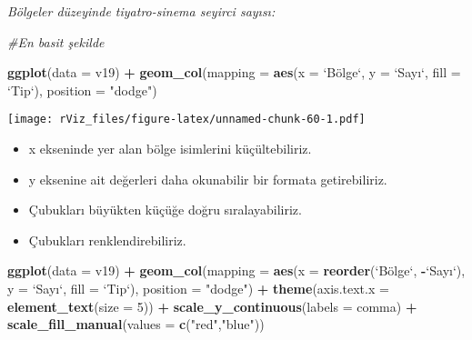\documentclass[
]{book}
\newenvironment{Shaded}{\begin{snugshade}}{\end{snugshade}}
\newcommand{\CommentTok}[1]{\textcolor[rgb]{0.56,0.35,0.01}{\textit{#1}}}
\newcommand{\DataTypeTok}[1]{\textcolor[rgb]{0.13,0.29,0.53}{#1}}
\newcommand{\DecValTok}[1]{\textcolor[rgb]{0.00,0.00,0.81}{#1}}
\newcommand{\KeywordTok}[1]{\textcolor[rgb]{0.13,0.29,0.53}{\textbf{#1}}}
\newcommand{\NormalTok}[1]{#1}
\newcommand{\OperatorTok}[1]{\textcolor[rgb]{0.81,0.36,0.00}{\textbf{#1}}}
\newcommand{\StringTok}[1]{\textcolor[rgb]{0.31,0.60,0.02}{#1}}
\begin{document}
\emph{Bölgeler düzeyinde tiyatro-sinema seyirci sayısı:}

\begin{Shaded}
\begin{Highlighting}[]
\CommentTok{#En basit şekilde}

\KeywordTok{ggplot}\NormalTok{(}\DataTypeTok{data =}\NormalTok{ v19) }\OperatorTok{+}
\StringTok{  }\KeywordTok{geom_col}\NormalTok{(}\DataTypeTok{mapping =} \KeywordTok{aes}\NormalTok{(}\DataTypeTok{x =} \StringTok{`}\DataTypeTok{Bölge}\StringTok{`}\NormalTok{, }\DataTypeTok{y =} \StringTok{`}\DataTypeTok{Sayı}\StringTok{`}\NormalTok{, }\DataTypeTok{fill =} \StringTok{`}\DataTypeTok{Tip}\StringTok{`}\NormalTok{), }\DataTypeTok{position =} \StringTok{"dodge"}\NormalTok{)}
\end{Highlighting}
\end{Shaded}

\texttt{[image: rViz\_files/figure-latex/unnamed-chunk-60-1.pdf]}

\begin{itemize}
\item
  x ekseninde yer alan bölge isimlerini küçültebiliriz.
\item
  y eksenine ait değerleri daha okunabilir bir formata getirebiliriz.
\item
  Çubukları büyükten küçüğe doğru sıralayabiliriz.
\item
  Çubukları renklendirebiliriz.
\end{itemize}

\begin{Shaded}
\begin{Highlighting}[]
\KeywordTok{ggplot}\NormalTok{(}\DataTypeTok{data =}\NormalTok{ v19) }\OperatorTok{+}
\StringTok{  }\KeywordTok{geom_col}\NormalTok{(}\DataTypeTok{mapping =} \KeywordTok{aes}\NormalTok{(}\DataTypeTok{x =} \KeywordTok{reorder}\NormalTok{(}\StringTok{`}\DataTypeTok{Bölge}\StringTok{`}\NormalTok{, }\OperatorTok{-}\StringTok{`}\DataTypeTok{Sayı}\StringTok{`}\NormalTok{), }\DataTypeTok{y =} \StringTok{`}\DataTypeTok{Sayı}\StringTok{`}\NormalTok{, }\DataTypeTok{fill =} \StringTok{`}\DataTypeTok{Tip}\StringTok{`}\NormalTok{), }\DataTypeTok{position =} \StringTok{"dodge"}\NormalTok{) }\OperatorTok{+}
\StringTok{  }\KeywordTok{theme}\NormalTok{(}\DataTypeTok{axis.text.x =} \KeywordTok{element_text}\NormalTok{(}\DataTypeTok{size =} \DecValTok{5}\NormalTok{)) }\OperatorTok{+}
\StringTok{  }\KeywordTok{scale_y_continuous}\NormalTok{(}\DataTypeTok{labels =}\NormalTok{ comma) }\OperatorTok{+}
\StringTok{  }\KeywordTok{scale_fill_manual}\NormalTok{(}\DataTypeTok{values =} \KeywordTok{c}\NormalTok{(}\StringTok{"red"}\NormalTok{,}\StringTok{"blue"}\NormalTok{))}
\end{Highlighting}
\end{Shaded}
\end{document}
